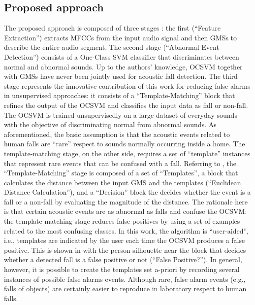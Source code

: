 \subsection{Proposed approach}
The proposed approach is composed of three stages : the first (``Feature Extraction'') extracts MFCCs from the input audio signal and then GMSs to describe the entire audio segment. The second stage (``Abnormal Event Detection'') consists of a One-Class SVM classifier that discriminates between normal and abnormal sounds. Up to the authors' knowledge, OCSVM together with GMSs have never been jointly used for acoustic fall detection.  The third stage represents the innovative contribution of this work for reducing false alarms in unsupervised approaches: it consists of a ``Template-Matching'' block that refines the output of the OCSVM and classifies the input data as fall or non-fall. The OCSVM is trained unsupervisedly on a large dataset of everyday sounds with the objective of discriminating normal from abnormal sounds. As aforementioned, the basic assumption is that the acoustic events related to human falls are ``rare'' respect to sounds normally occurring inside a home. The template-matching stage, on the other side, requires a set of ``template'' instances that represent rare events that can be confused with a fall. Referring to , the ``Template-Matching'' stage is composed of a set of ``Templates'', a block that calculates the distance between the input GMS and the templates (``Euclidean Distance Calculation''), and a ``Decision'' block the decides whether the event is a fall or a non-fall by evaluating the magnitude of the distance.  The rationale here is that certain acoustic events are as abnormal as falls and confuse the OCSVM: the template-matching stage reduces false positives by using a set of examples related to the most confusing classes. In this work, the algorithm is ``user-aided'', i.e., templates are indicated by the user each time the OCSVM produces a false positive. This is shown in  with the person silhouette near the block that decides whether a detected fall is a false positive or not (``False Positive?''). In general, however, it is possible to create the templates set a-priori by recording several instances of possible false alarms events. Although rare, false alarm events (e.g., falls of objects) are certainly easier to reproduce in laboratory respect to human falls.

